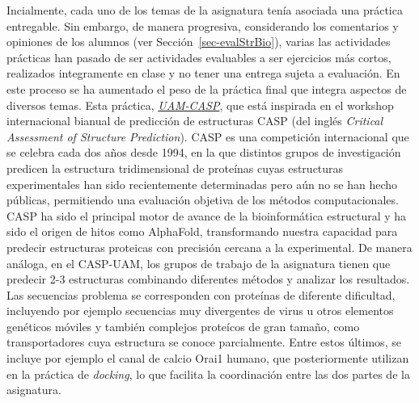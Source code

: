 \documentclass[
  11pt,
  a4paper,
  twoside]{scrreprt}
\begin{document}
Incialmente, cada uno de los temas de la asignatura tenía asociada una
práctica entregable. Sin embargo, de manera progresiva, considerando los
comentarios y opiniones de los alumnos (ver
Sección~\ref{sec-evalStrBio}), varias las actividades prácticas han
pasado de ser actividades evaluables a ser ejercicios más cortos,
realizados integramente en clase y no tener una entrega sujeta a
evaluación. En este proceso se ha aumentado el peso de la práctica final
que integra aspectos de diversos temas. Esta práctica,
\href{https://strbio.github.io/casp.html}{\emph{UAM-CASP}}, que está
inspirada en el workshop internacional bianual de predicción de
estructuras CASP (del inglés \emph{Critical Assessment of Structure
Prediction}). CASP es una competición internacional que se celebra cada
dos años desde 1994, en la que distintos grupos de investigación
predicen la estructura tridimensional de proteínas cuyas estructuras
experimentales han sido recientemente determinadas pero aún no se han
hecho públicas, permitiendo una evaluación objetiva de los métodos
computacionales. CASP ha sido el principal motor de avance de la
bioinformática estructural y ha sido el origen de hitos como AlphaFold,
transformando nuestra capacidad para predecir estructuras proteicas con
precisión cercana a la experimental. De manera análoga, en el CASP-UAM,
los grupos de trabajo de la asignatura tienen que predecir 2-3
estructuras combinando diferentes métodos y analizar los resultados. Las
secuencias problema se corresponden con proteínas de diferente
dificultad, incluyendo por ejemplo secuencias muy divergentes de virus u
otros elementos genéticos móviles y también complejos proteícos de gran
tamaño, como transportadores cuya estructura se conoce parcialmente.
Entre estos últimos, se incluye por ejemplo el canal de calcio Orai1
humano, que posteriormente utilizan en la práctica de \emph{docking}, lo
que facilita la coordinación entre las dos partes de la asignatura.
\end{document}
